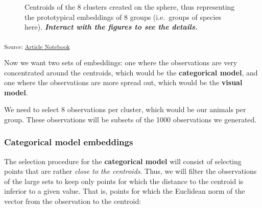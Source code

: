 \documentclass[
  authoryear]{elsarticle}
\begin{document}
\label{cell-fig-centroids}
\begin{figure}[H]


\caption{\label{fig-centroids}Centroids of the 8 clusters created on the
sphere, thus representing the prototypical embeddings of 8 groups
(i.e.~groups of species here). \textbf{\emph{Interact with the figures
to see the details.}}}

\end{figure}%

\textsubscript{Source:
\href{https://m-delem.github.io/2499-similarity-manuscript/index.qmd.html}{Article
Notebook}}

Now we want two sets of embeddings: one where the observations are very
concentrated around the centroids, which would be the
\textbf{categorical model}, and one where the observations are more
spread out, which would be the \textbf{visual model}.

We need to select 8 observations per cluster, which would be our animals
per group. These observations will be subsets of the 1000 observations
we generated.

\subsubsection{Categorical model
embeddings}\label{categorical-model-embeddings}

The selection procedure for the \textbf{categorical model} will consist
of selecting points that are rather \emph{close to the centroids}. Thus,
we will filter the observations of the large sets to keep only points
for which the distance to the centroid is inferior to a given value.
That is, points for which the Euclidean norm of the vector from the
observation to the centroid:
\end{document}
